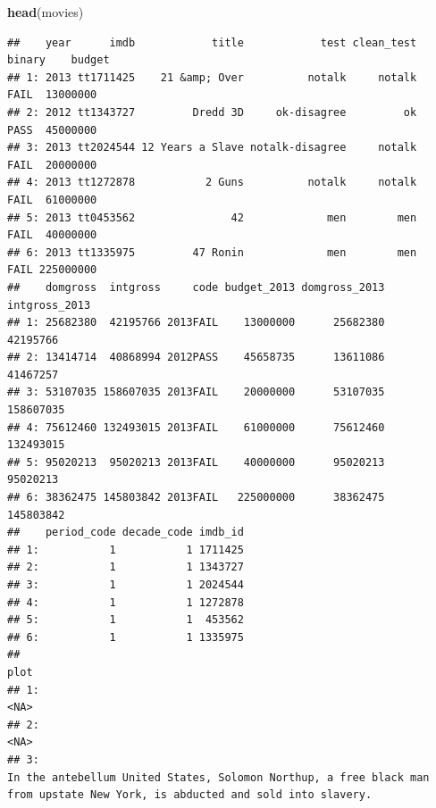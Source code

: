 \documentclass[
  b5paper]{book}
\newenvironment{Shaded}{\begin{snugshade}}{\end{snugshade}}
\newcommand{\FunctionTok}[1]{\textcolor[rgb]{0.13,0.29,0.53}{\textbf{#1}}}
\newcommand{\NormalTok}[1]{#1}
\begin{document}
\begin{Shaded}
\begin{Highlighting}[]
\FunctionTok{head}\NormalTok{(movies)}
\end{Highlighting}
\end{Shaded}

\begin{verbatim}
##    year      imdb            title            test clean_test binary    budget
## 1: 2013 tt1711425    21 &amp; Over          notalk     notalk   FAIL  13000000
## 2: 2012 tt1343727         Dredd 3D     ok-disagree         ok   PASS  45000000
## 3: 2013 tt2024544 12 Years a Slave notalk-disagree     notalk   FAIL  20000000
## 4: 2013 tt1272878           2 Guns          notalk     notalk   FAIL  61000000
## 5: 2013 tt0453562               42             men        men   FAIL  40000000
## 6: 2013 tt1335975         47 Ronin             men        men   FAIL 225000000
##    domgross  intgross     code budget_2013 domgross_2013 intgross_2013
## 1: 25682380  42195766 2013FAIL    13000000      25682380      42195766
## 2: 13414714  40868994 2012PASS    45658735      13611086      41467257
## 3: 53107035 158607035 2013FAIL    20000000      53107035     158607035
## 4: 75612460 132493015 2013FAIL    61000000      75612460     132493015
## 5: 95020213  95020213 2013FAIL    40000000      95020213      95020213
## 6: 38362475 145803842 2013FAIL   225000000      38362475     145803842
##    period_code decade_code imdb_id
## 1:           1           1 1711425
## 2:           1           1 1343727
## 3:           1           1 2024544
## 4:           1           1 1272878
## 5:           1           1  453562
## 6:           1           1 1335975
##                                                                                                                                                                                                                                               plot
## 1:                                                                                                                                                                                                                                            <NA>
## 2:                                                                                                                                                                                                                                            <NA>
## 3:                                                                                                                    In the antebellum United States, Solomon Northup, a free black man from upstate New York, is abducted and sold into slavery.

\end{verbatim}
\end{document}

